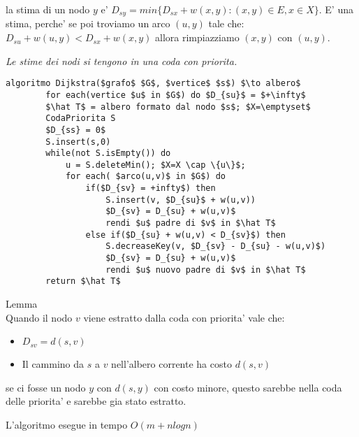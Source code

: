la stima di un nodo $y$ e' $D_{sy} = min\{D_{sx} + w(x,y) : (x,y) \in E, x \in X\}$. 
E' una stima, perche' se poi troviamo un arco $(u,y)$ tale che: $D_{su} + w(u,y) < D_{sx} + w(x,y)$ allora
rimpiazziamo $(x,y)$ con $(u,y)$.

\textit{Le stime dei nodi si tengono in una coda con priorita.}

\begin{lstlisting}[mathescape=true]
    algoritmo Dijkstra($grafo$ $G$, $vertice$ $s$) $\to albero$
        for each(vertice $u$ in $G$) do $D_{su}$ = $+\infty$
        $\hat T$ = albero formato dal nodo $s$; $X=\emptyset$
        CodaPriorita S
        $D_{ss} = 0$
        S.insert(s,0)
        while(not S.isEmpty()) do
            u = S.deleteMin(); $X=X \cap \{u\}$;
            for each( $arco(u,v)$ in $G$) do
                if($D_{sv} = +infty$) then
                    S.insert(v, $D_{su}$ + w(u,v))
                    $D_{sv} = D_{su} + w(u,v)$
                    rendi $u$ padre di $v$ in $\hat T$
                else if($D_{su} + w(u,v) < D_{sv}$) then
                    S.decreaseKey(v, $D_{sv} - D_{su} - w(u,v)$)
                    $D_{sv} = D_{su} + w(u,v)$
                    rendi $u$ nuovo padre di $v$ in $\hat T$
        return $\hat T$
\end{lstlisting}

\begin{definition} Lemma \\
    Quando il nodo $v$ viene estratto dalla coda con priorita' vale che:
    \begin{itemize}
        \item $D_{sv} = d(s,v)$
        \item Il cammino da $s$ a $v$ nell'albero corrente ha costo $d(s,v)$
    \end{itemize}
\end{definition}

se ci fosse un nodo $y$ con $d(s,y)$ con costo minore, questo sarebbe nella coda delle priorita' 
e sarebbe gia stato estratto.

L'algoritmo esegue in tempo $O(m+nlogn)$